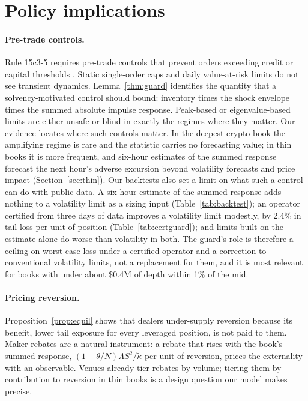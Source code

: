 \section{Policy implications}\label{sec:policy}

\paragraph{Pre-trade controls.} Rule 15c3-5 requires pre-trade controls that prevent orders exceeding credit or capital thresholds \citep{sec2010}. Static single-order caps and daily value-at-risk limits do not see transient dynamics. Lemma~\ref{thm:guard} identifies the quantity that a solvency-motivated control should bound: inventory times the shock envelope times the summed absolute impulse response. Peak-based or eigenvalue-based limits are either unsafe or blind in exactly the regimes where they matter. Our evidence locates where such controls matter. In the deepest crypto book the amplifying regime is rare and the statistic carries no forecasting value; in thin books it is more frequent, and six-hour estimates of the summed response forecast the next hour's adverse excursion beyond volatility forecasts and price impact (Section~\ref{sec:thin}). Our backtests also set a limit on what such a control can do with public data. A six-hour estimate of the summed response adds nothing to a volatility limit as a sizing input (Table~\ref{tab:backtest}); an operator certified from three days of data improves a volatility limit modestly, by 2.4\% in tail loss per unit of position (Table~\ref{tab:certguard}); and limits built on the estimate alone do worse than volatility in both. The guard's role is therefore a ceiling on worst-case loss under a certified operator and a correction to conventional volatility limits, not a replacement for them, and it is most relevant for books with under about \$0.4M of depth within 1\% of the mid.

\paragraph{Pricing reversion.} Proposition~\ref{prop:equil} shows that dealers under-supply reversion because its benefit, lower tail exposure for every leveraged position, is not paid to them. Maker rebates are a natural instrument: a rebate that rises with the book's summed response, $(1-\theta/N)\Lambda S^2/\tilde\kappa$ per unit of reversion, prices the externality with an observable. Venues already tier rebates by volume; tiering them by contribution to reversion in thin books is a design question our model makes precise.


